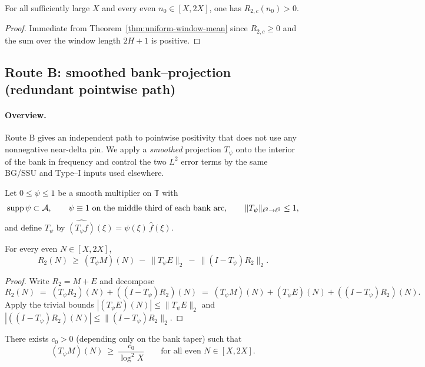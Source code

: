 \begin{corollary}
\label{cor:pointwise}
For all sufficiently large $X$ and every even $n_0\in[X,2X]$, one has $R_{2,c}(n_0)>0$.
\end{corollary}

\begin{proof}
Immediate from Theorem~\ref{thm:uniform-window-mean} since $R_{2,c}\ge 0$ and the sum over the window length $2H+1$ is positive.
\end{proof}

\subsection{Route B: smoothed bank–projection (redundant pointwise path)}
\label{subsec:routeBprime}

\paragraph*{Overview.}
Route B gives an independent path to pointwise positivity that does not use any nonnegative near-delta pin. 
We apply a \emph{smoothed} projection $T_\psi$ onto the interior of the bank in frequency and control the two $L^2$ error terms by the same BG/SSU and Type–I inputs used elsewhere.

\medskip
Let $0\le \psi\le 1$ be a smooth multiplier on $\mathbb{T}$ with
\[
\operatorname{supp}\psi \subset \mathcal{A},\qquad 
\psi\equiv 1\ \text{on the middle third of each bank arc},\qquad 
\|T_\psi\|_{\ell^2\to\ell^2}\le 1,
\]
and define $T_\psi$ by $\widehat{(T_\psi f)}(\xi)=\psi(\xi)\,\widehat f(\xi)$.

\begin{lemma}\label{lem:smoothed-proj}
For every even $N\in[X,2X]$,
\[
R_2(N)\ \ge\ (T_\psi M)(N)\ -\ \|T_\psi E\|_2\ -\ \|(I-T_\psi)R_2\|_2.
\]
\end{lemma}

\begin{proof}
Write $R_2=M+E$ and decompose
\[
R_2(N) \;=\; (T_\psi R_2)(N) + ((I-T_\psi)R_2)(N)
\;=\; (T_\psi M)(N) + (T_\psi E)(N) + ((I-T_\psi)R_2)(N).
\]
Apply the trivial bounds $|(T_\psi E)(N)|\le \|T_\psi E\|_2$ and $|((I-T_\psi)R_2)(N)|\le \|(I-T_\psi)R_2\|_2$.
\end{proof}

\begin{lemma}\label{lem:TpsiM-lb}
There exists $c_0>0$ (depending only on the bank taper) such that
\[
(T_\psi M)(N)\ \ge\ \frac{c_0}{\log^2 X}\qquad \text{for all even }N\in[X,2X].
\]
\end{lemma}


